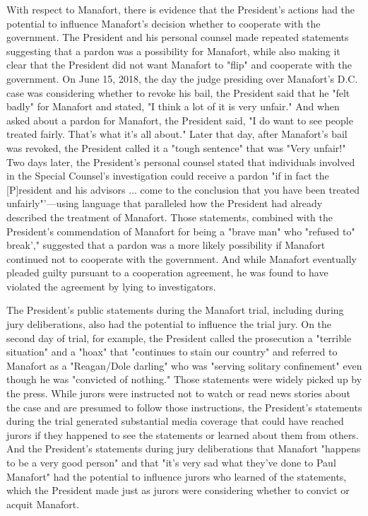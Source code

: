 {With respect to Manafort, there is evidence that the President's actions had the potential to influence Manafort's decision whether to cooperate with the government.
The President and his personal counsel made repeated statements suggesting that a pardon was a possibility for Manafort, while also making it clear that the President did not want Manafort to "flip" and cooperate with the government.
On June 15, 2018, the day the judge presiding over Manafort's D.C. case was considering whether to revoke his bail, the President said that he "felt badly" for Manafort and stated, "I think a lot of it is very unfair."
And when asked about a pardon for Manafort, the President said, "I do want to see people treated fairly.
That's what it's all about." Later that day, after Manafort's bail was revoked, the President called it a "tough sentence" that was "Very unfair!"
Two days later, the President's personal counsel stated that individuals involved in the Special Counsel's investigation could receive a pardon "if in fact the [P]resident and his advisors ... come to the conclusion that you have been treated unfairly"'—using language that paralleled how the President had already described the treatment of Manafort.
Those statements, combined with the President's commendation of Manafort for being a "brave man" who "refused to" break'," suggested that a pardon was a more likely possibility if Manafort continued not to cooperate with the government.
And while Manafort eventually pleaded guilty pursuant to a cooperation agreement, he was found to have violated the agreement by lying to investigators.

The President's public statements during the Manafort trial, including during jury deliberations, also had the potential to influence the trial jury.
On the second day of trial, for example, the President called the prosecution a "terrible situation" and a "hoax" that "continues to stain our country" and referred to Manafort as a "Reagan/Dole darling" who was "serving solitary confinement" even though he was "convicted of nothing."
Those statements were widely picked up by the press.
While jurors were instructed not to watch or read news stories about the case and are presumed to follow those instructions, the President's statements during the trial generated substantial media coverage that could have reached jurors if they happened to see the statements or learned about them from others.
And the President's statements during jury deliberations that Manafort "happens to be a very good person" and that "it's very sad what they've done to Paul Manafort" had the potential to influence jurors who learned of the statements, which the President made just as jurors were considering whether to convict or acquit Manafort.

}
